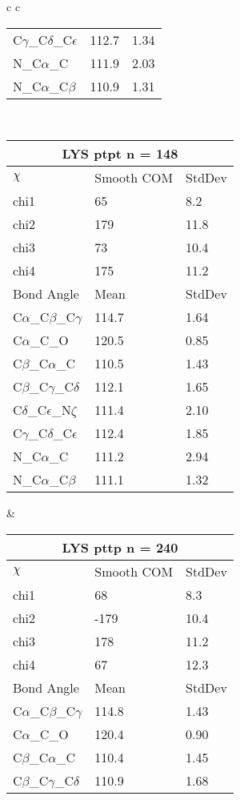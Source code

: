 \begin{longtable}{ c c }
\begin{tabular}{ l l l }
  C$\gamma$\_C$\delta$\_C$\epsilon$ & 112.7 & 1.34\\
  N\_C$\alpha$\_C & 111.9 & 2.03\\
  N\_C$\alpha$\_C$\beta$ & 110.9 & 1.31\\
  \bottomrule
  \end{tabular}
  \\
  \begin{tabular}{ l l l }
  \toprule
  \multicolumn{3}{c}{LYS \textbf{ptpt} n = 148} \\ \toprule
  $\chi$       & Smooth COM & StdDev \\ \midrule
  chi1 & 65 & 8.2 \\ 
  chi2 & 179 & 11.8 \\ 
  chi3 & 73 & 10.4 \\ 
  chi4 & 175 & 11.2 \\ \midrule
  Bond Angle   & Mean     & StdDev \\ \midrule
  C$\alpha$\_C$\beta$\_C$\gamma$ & 114.7 & 1.64\\
  C$\alpha$\_C\_O & 120.5 & 0.85\\
  C$\beta$\_C$\alpha$\_C & 110.5 & 1.43\\
  C$\beta$\_C$\gamma$\_C$\delta$ & 112.1 & 1.65\\
  C$\delta$\_C$\epsilon$\_N$\zeta$ & 111.4 & 2.10\\
  C$\gamma$\_C$\delta$\_C$\epsilon$ & 112.4 & 1.85\\
  N\_C$\alpha$\_C & 111.2 & 2.94\\
  N\_C$\alpha$\_C$\beta$ & 111.1 & 1.32\\
  \bottomrule
  \end{tabular}
  &
  \begin{tabular}{ l l l }
  \toprule
  \multicolumn{3}{c}{LYS \textbf{pttp} n = 240} \\ \toprule
  $\chi$       & Smooth COM & StdDev \\ \midrule
  chi1 & 68 & 8.3 \\ 
  chi2 & -179 & 10.4 \\ 
  chi3 & 178 & 11.2 \\ 
  chi4 & 67 & 12.3 \\ \midrule
  Bond Angle   & Mean     & StdDev \\ \midrule
  C$\alpha$\_C$\beta$\_C$\gamma$ & 114.8 & 1.43\\
  C$\alpha$\_C\_O & 120.4 & 0.90\\
  C$\beta$\_C$\alpha$\_C & 110.4 & 1.45\\
  C$\beta$\_C$\gamma$\_C$\delta$ & 110.9 & 1.68\\

\end{tabular}
\end{longtable}
